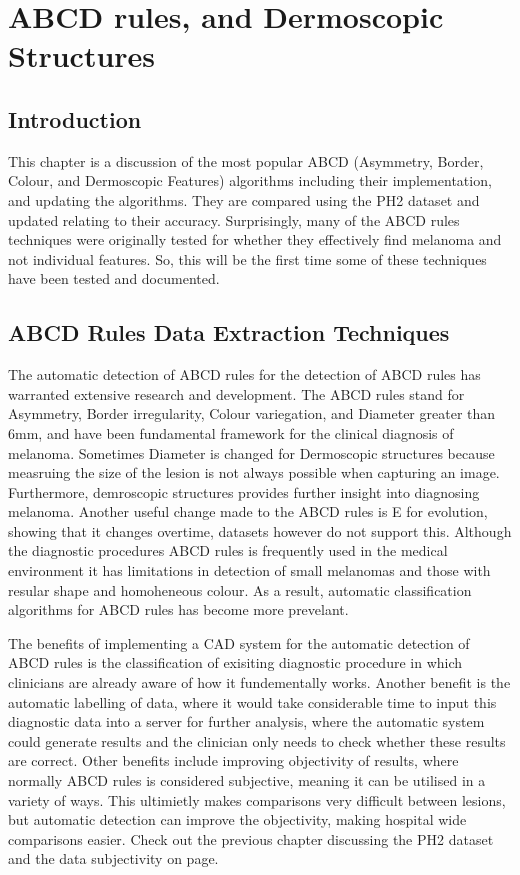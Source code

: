 
\chapter{ABCD rules, and Dermoscopic Structures}

\section{Introduction}
This chapter is a discussion of the most popular ABCD (Asymmetry, Border, Colour, and Dermoscopic Features) algorithms including their implementation, and updating the algorithms. They are compared using the PH2 dataset and updated relating to their accuracy. Surprisingly, many of the ABCD rules techniques were originally tested for whether they effectively find melanoma and not individual features. So, this will be the first time some of these techniques have been tested and documented.

\section{ABCD Rules Data Extraction Techniques}
The automatic detection of ABCD rules for the detection of ABCD rules has warranted extensive research and development\cite{Ali2020}. The ABCD rules stand for Asymmetry, Border irregularity, Colour variegation, and Diameter greater than 6mm, and have been fundamental framework for the clinical diagnosis of melanoma. Sometimes Diameter is changed for Dermoscopic structures because measruing the size of the lesion is not always possible when capturing an image. Furthermore, demroscopic structures provides further insight into diagnosing melanoma\cite{}. Another useful change made to the ABCD rules is E for evolution, showing that it changes overtime, datasets however do not support this. Although the diagnostic procedures ABCD rules is frequently used in the medical environment it has limitations in detection of small melanomas and those with resular shape and homoheneous colour\cite{Argenziano2006}. As a result, automatic classification algorithms for ABCD rules has become more prevelant\cite{Kasmi2016}.

The benefits of implementing a CAD system for the automatic detection of ABCD rules is the classification of exisiting diagnostic procedure in which clinicians are already aware of how it fundementally works. Another benefit is the automatic labelling of data, where it would take considerable time to input this diagnostic data into a server for further analysis, where the automatic system could generate results and the clinician only needs to check whether these results are correct. Other benefits include improving objectivity of results, where normally ABCD rules is considered subjective, meaning it can be utilised in a variety of ways. This ultimietly makes comparisons very difficult between lesions, but automatic detection can improve the objectivity, making hospital wide comparisons easier. Check out the previous chapter discussing the PH2 dataset and the data subjectivity on page\pageref*{ph2-image-assessment}.

